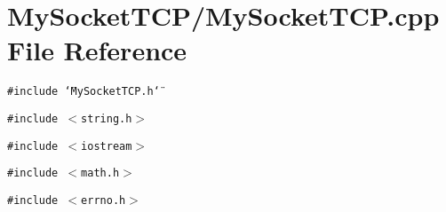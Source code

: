 \section{My\-Socket\-TCP/My\-Socket\-TCP.cpp File Reference}
\label{MySocketTCP_8cpp}
{\tt \#include \char`\"{}My\-Socket\-TCP.h\char`\"{}}\par
{\tt \#include $<$string.h$>$}\par
{\tt \#include $<$iostream$>$}\par
{\tt \#include $<$math.h$>$}\par
{\tt \#include $<$errno.h$>$}\par
